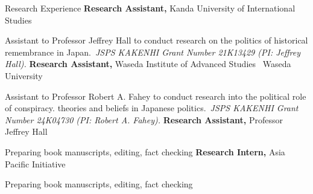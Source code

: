 \begin{rubric}{Research Experience}
\entry*[2025/06 (Starting)]%
\textbf{Research Assistant,} Kanda University of International Studies
\par Assistant to Professor Jeffrey Hall to conduct research on the politics of historical remembrance in Japan.\ \emph{JSPS KAKENHI Grant Number 21K13429 (PI: Jeffrey Hall).}
%
%
%
\entry*[2023/09 -- 2025/03]%
\textbf{Research Assistant,} Waseda Institute of Advanced Studies
\ Waseda University
        \par Assistant to Professor Robert A. Fahey to conduct research into the political role of conspiracy. theories and beliefs in Japanese politics.\ \emph{JSPS KAKENHI Grant Number 24K04730 (PI: Robert A. Fahey).}
\entry*[2020/09 -- 2020/10]%
\textbf{Research Assistant,} Professor Jeffrey Hall
\par Preparing book manuscripts, editing, fact checking
 \entry*[2020/04 -- 2020/06]%
 \textbf{Research Intern,} Asia Pacific Initiative
        \par Preparing book manuscripts, editing, fact checking
 \end{rubric}
